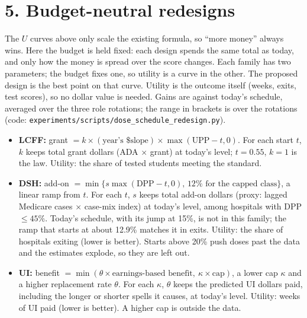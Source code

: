 \documentclass[10pt]{article}
\begin{document}
\newpage
\section*{5. Budget-neutral redesigns}

The $U$ curves above only scale the existing formula, so ``more money'' always wins. Here the
budget is held fixed: each design spends the same total as today, and only how the money is
spread over the score changes. Each family has two parameters; the budget fixes one, so
utility is a curve in the other. The proposed design is the best point on that curve. Utility
is the outcome itself (weeks, exits, test scores), so no dollar value is needed. Gains are
against today's schedule, averaged over the three role rotations; the range in brackets is
over the rotations (code: \texttt{experiments/scripts/dose\_schedule\_redesign.py}).

\begin{itemize}
\item \textbf{LCFF:} grant $=k\times(\text{year's \$ slope})\times\max(\text{UPP}-t,0)$. For each start
 $t$, $k$ keeps total grant dollars (ADA $\times$ grant) at today's level; $t=0.55$, $k=1$ is the law.
 Utility: the share of tested students meeting the standard.
\item \textbf{DSH:} add-on $=\min\{s\max(\text{DPP}-t,0),\,12\%\text{ for the capped class}\}$, a linear
 ramp from $t$. For each $t$, $s$ keeps total add-on dollars (proxy: lagged Medicare cases
 $\times$ case-mix index) at today's level, among hospitals with DPP $\le45\%$. Today's schedule,
 with its jump at 15\%, is not in this family; the ramp that starts at about 12.9\% matches it
 in exits. Utility: the share of hospitals exiting (lower is better). Starts above 20\% push
 doses past the data and the estimates explode, so they are left out.
\item \textbf{UI:} benefit $=\min(\theta\times\text{earnings-based benefit},\ \kappa\times\text{cap})$, a lower
 cap $\kappa$ and a higher replacement rate $\theta$. For each $\kappa$, $\theta$ keeps the predicted
 UI dollars paid, including the longer or shorter spells it causes, at today's level.
 Utility: weeks of UI paid (lower is better). A higher cap is outside the data.
\end{itemize}
\end{document}
